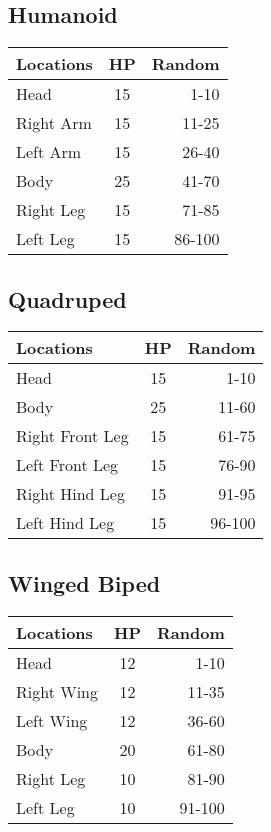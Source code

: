 \pagebreak
\begin{multicols}{2}
\subsection{Humanoid}
\begin{minipage}{\columnwidth}
	\begin{tabularx}{\columnwidth}{|X|c|r|}
		\hline
		Locations & HP & Random \\ \hline
		Head      & 15 &   1-10 \\ \hline
		Right Arm & 15 &  11-25 \\ \hline
		Left Arm  & 15 &  26-40 \\ \hline
		Body      & 25 &  41-70 \\ \hline
		Right Leg & 15 &  71-85 \\ \hline
		Left Leg  & 15 & 86-100 \\ \hline
	\end{tabularx}
\end{minipage}

\subsection{Quadruped}
\begin{minipage}{\columnwidth}
	\begin{tabularx}{\columnwidth}{|X|c|r|}
		\hline
		Locations       & HP & Random \\ \hline
		Head            & 15 &   1-10 \\ \hline
		Body            & 25 &  11-60 \\ \hline
		Right Front Leg & 15 &  61-75 \\ \hline
		Left Front Leg  & 15 &  76-90 \\ \hline
		Right Hind Leg  & 15 &  91-95 \\ \hline
		Left Hind Leg   & 15 & 96-100 \\ \hline
	\end{tabularx}
\end{minipage}

\subsection{Winged Biped}
\begin{minipage}{\columnwidth}
	\begin{tabularx}{\columnwidth}{|X|c|r|}
		\hline
		Locations  & HP & Random \\ \hline
		Head       & 12 &   1-10 \\ \hline
		Right Wing & 12 &  11-35 \\ \hline
		Left Wing  & 12 &  36-60 \\ \hline
		Body       & 20 &  61-80 \\ \hline
		Right Leg  & 10 &  81-90 \\ \hline
		Left Leg   & 10 & 91-100 \\ \hline
	\end{tabularx}
\end{minipage}


\end{multicols}
